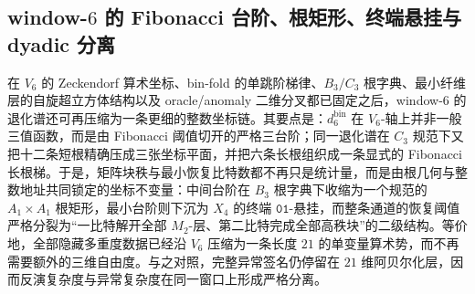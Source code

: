 \subsection{window-\texorpdfstring{$6$}{6} 的 Fibonacci 台阶、根矩形、终端悬挂与 dyadic 分离}\label{subsec:conclusion-window6-fibonacci-staircase-root-rectangle-dyadic-separation}
在 \(V_6\) 的 Zeckendorf 算术坐标、bin-fold 的单跳阶梯律、\(B_3/C_3\) 根字典、最小纤维层的自旋超立方体结构以及 oracle/anomaly 二维分叉都已固定之后，window-\(6\) 的退化谱还可再压缩为一条更细的整数坐标链。其要点是：\(d_6^{\mathrm{bin}}\) 在 \(V_6\)-轴上并非一般三值函数，而是由 Fibonacci 阈值切开的严格三台阶；同一退化谱在 \(C_3\) 规范下又把十二条短根精确压成三张坐标平面，并把六条长根组织成一条显式的 Fibonacci 长根梯。于是，矩阵块秩与最小恢复比特数都不再只是统计量，而是由根几何与整数地址共同锁定的坐标不变量：中间台阶在 \(B_3\) 根字典下收缩为一个规范的 \(A_1\times A_1\) 根矩形，最小台阶则下沉为 \(X_4\) 的终端 \(\mathtt{01}\)-悬挂，而整条通道的恢复阈值严格分裂为“一比特解开全部 \(M_2\)-层、第二比特完成全部高秩块”的二级结构。等价地，全部隐藏多重度数据已经沿 \(V_6\) 压缩为一条长度 \(21\) 的单变量算术势，而不再需要额外的三维自由度。与之对照，完整异常签名仍停留在 \(21\) 维阿贝尔化层，因而反演复杂度与异常复杂度在同一窗口上形成严格分离。

